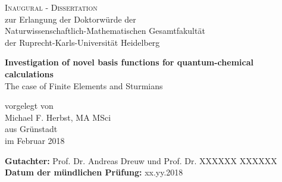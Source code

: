 \begin{titlepage}
\begin{center}

	\Huge \textsc{Inaugural - Dissertation} \\[0.4cm]
	{\Large zur Erlangung der Doktorwürde der \\
	Naturwissenschaftlich-Mathematischen Gesamtfakultät \\
	der Ruprecht-Karls-Universität Heidelberg\\
	}

	\vfill

	{\Huge
	\textbf{Investigation of novel basis functions for quantum-chemical calculations}\\
	\vspace{0.5cm}
	\LARGE The case of Finite Elements and Sturmians %
	}

	\vfill

	{\large  vorgelegt von} \\
	\vspace{1.0cm}
	{\LARGE Michael F. Herbst, {\large \mbox{MA} \mbox{MSci}} }\\[-0.3em]
	{\large aus Grünstadt } \\
	\vspace{1.0cm}
	{\large im Februar 2018} \\

	\vspace{2cm}

	\begin{flushleft}
	\normalsize
		\textbf{Gutachter:} \qquad Prof. Dr. Andreas Dreuw \hfill und \hfill Prof. Dr. XXXXXX XXXXXX\\
		\textbf{Datum der mündlichen Prüfung:} \qquad xx.yy.2018
	\end{flushleft}
\end{center}
\end{titlepage}
